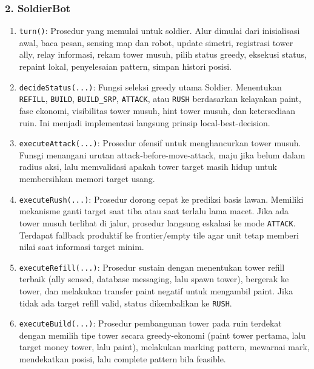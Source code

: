 \subsubsection{2. SoldierBot}
\begin{enumerate}
	\item \texttt{turn()}:
	      Prosedur yang memulai untuk soldier. Alur dimulai dari inisialisasi awal, baca pesan, sensing map dan robot, update simetri, registrasi tower ally, relay informasi, rekam tower musuh, pilih status greedy, eksekusi status, repaint lokal, penyelesaian pattern, simpan histori posisi.

	\item \texttt{decideStatus(...)}:
	      Fungsi seleksi greedy utama Soldier. Menentukan \texttt{REFILL}, \texttt{BUILD}, \texttt{BUILD\_SRP}, \texttt{ATTACK}, atau \texttt{RUSH} berdasarkan kelayakan paint, fase ekonomi, visibilitas tower musuh, hint tower musuh, dan ketersediaan ruin. Ini menjadi implementasi langsung prinsip local-best-decision.

	\item \texttt{executeAttack(...)}:
	      Prosedur ofensif untuk menghancurkan tower musuh. Funsgi menangani urutan attack-before-move-attack, maju jika belum dalam radius aksi, lalu memvalidasi apakah tower target masih hidup untuk membersihkan memori target usang.

	\item \texttt{executeRush(...)}:
	      Prosedur dorong cepat ke prediksi basis lawan. Memiliki mekanisme ganti target saat tiba atau saat terlalu lama macet. Jika ada tower musuh terlihat di jalur, prosedur langsung eskalasi ke mode \texttt{ATTACK}. Terdapat fallback produktif ke frontier/empty tile agar unit tetap memberi nilai saat informasi target minim.

	\item \texttt{executeRefill(...)}:
	      Prosedur sustain dengan menentukan tower refill terbaik (ally sensed, database messaging, lalu spawn tower), bergerak ke tower, dan melakukan transfer paint negatif untuk mengambil paint. Jika tidak ada target refill valid, status dikembalikan ke \texttt{RUSH}.

	\item \texttt{executeBuild(...)}:
	      Prosedur pembangunan tower pada ruin terdekat dengan memilih tipe tower secara greedy-ekonomi (paint tower pertama, lalu target money tower, lalu paint), melakukan marking pattern, mewarnai mark, mendekatkan posisi, lalu complete pattern bila feasible.


\end{enumerate}
